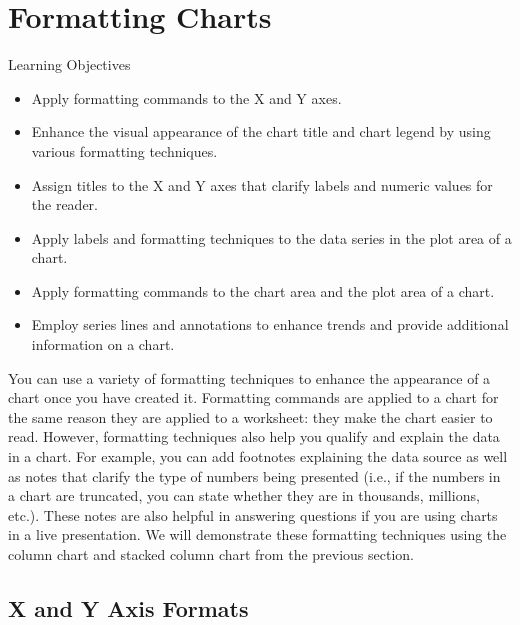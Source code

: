 \section{Formatting Charts}


\begin{center}
	\begin{objbox}{Learning Objectives}
		\begin{itemize}
			\setlength{\itemsep}{0pt}
			\setlength{\parskip}{0pt}
			\setlength{\parsep}{0pt}

			\item Apply formatting commands to the X and Y axes.
			\item Enhance the visual appearance of the chart title and chart legend by using various formatting techniques.
			\item Assign titles to the X and Y axes that clarify labels and numeric values for the reader.
			\item Apply labels and formatting techniques to the data series in the plot area of a chart.
			\item Apply formatting commands to the chart area and the plot area of a chart.
			\item Employ series lines and annotations to enhance trends and provide additional information on a chart.
			
		\end{itemize}
	\end{objbox}
\end{center}


You can use a variety of formatting techniques to enhance the appearance of a chart once you have
created it. Formatting commands are applied to a chart for the same reason they are applied to a
worksheet: they make the chart easier to read. However, formatting techniques also help you qualify
and explain the data in a chart. For example, you can add footnotes explaining the data source as
well as notes that clarify the type of numbers being presented (i.e., if the numbers in a chart are
truncated, you can state whether they are in thousands, millions, etc.). These notes are also helpful
in answering questions if you are using charts in a live presentation. We will demonstrate these
formatting techniques using the column chart and stacked column chart from the previous section.

\subsection{X and Y Axis Formats}

